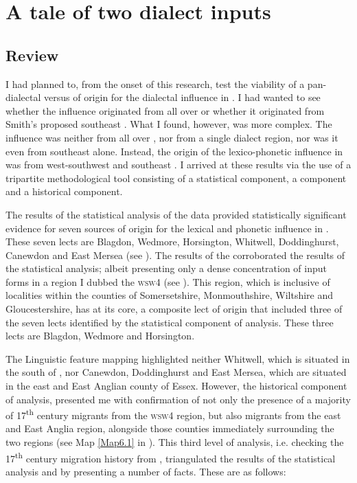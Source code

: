 \chapter{A tale of two dialect inputs}\label{ch:7}

\section{Review}\label{7.1}
I had planned to, from the onset of this research, test the viability of a pan-dialectal versus  of origin for the  dialectal influence in . I had wanted to see whether the influence originated from all over  or whether it originated from Smith's  proposed southeast  \citep{Smith87, Smith08}. What I found, however, was more complex. The influence was neither from all over , nor from a single dialect region, nor was it even from southeast  alone. Instead, the origin of the  lexico-phonetic influence in  was from west-southwest  and southeast . I arrived at these results via the use of a tripartite methodological tool consisting of a statistical component, a  component and a historical component.

The results of the statistical analysis of the data provided statistically significant evidence for seven  sources of origin for the lexical and phonetic influence in . These seven lects are Blagdon, Wedmore, Horsington, Whitwell, Doddinghurst, Canewdon and East Mersea (see ). The results of the  corroborated the results of the statistical analysis; albeit presenting only a dense concentration of input forms in a region I dubbed the \textsc{wsw4} (see ). This region, which is inclusive of localities within the counties of Somersetshire, Monmouthshire, Wiltshire and Gloucestershire, has at its core, a composite lect of origin that included three of the seven lects identified by the statistical component of analysis. These three lects are Blagdon, Wedmore and Horsington.

The Linguistic feature mapping highlighted neither Whitwell, which is situated in the south of , nor Canewdon, Doddinghurst and East Mersea, which are situated in the east and East Anglian county of Essex. However, the historical component of analysis, presented me with confirmation of not only the presence of a majority of 17\textsuperscript{th} century migrants from the \textsc{wsw4} region, but also migrants from the east and East Anglia region, alongside those counties immediately surrounding the two regions (see Map \ref{Map6.1} in ). This third level of analysis, i.e. checking the 17\textsuperscript{th} century  migration history from , triangulated the results of the statistical analysis and  by presenting a number of facts. These are as follows:

